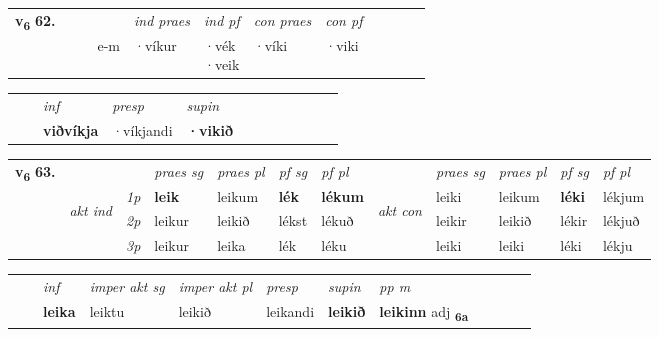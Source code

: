 \begin{tabular}{llllllllllll}\toprule
\multirow{4}{*}{{{\textbf{v{\textsubscript{6}}} \Large{\textbf{62.}}}}}  & &  & &  \textit{ind praes} & \textit{ind pf} & \textit{con praes} & \textit{con pf} \\*
&  & & e-m & ·víkur & \specialcell{·vék\\  ·veik} & ·víki & ·viki \\*
\cmidrule{5-9}
\end{tabular}


\begin{tabular}{llllllllllll}
 & & \textit{inf}     & \textit{presp} & \textit{supin}       \\*
  & & \textbf{viðvíkja}      & ·víkjandi &  \textbf{·vikið}   \\*
\cmidrule{1-12}
\end{tabular}



\begin{tabular}{llllllllllll} \toprule
\multirow{4}{*}{{{\textbf{v{\textsubscript{6}}} \Large{\textbf{63.}}}}}  & &   &  \textit{praes sg}  & \textit{praes pl}  &\textit{ pf sg} & \textit{pf pl} &  &  \textit{praes sg}  & \textit{praes pl}  & \textit{pf sg} & \textit{pf pl } \\*
	\cmidrule{4-7} \cmidrule{9-12}
 & \multirow{3}{*}{\begin{turn}{90}\textit{akt ind}\end{turn}} & {\textit{1p}} & \textbf{leik} & leikum    & \textbf{lék} & \textbf{lékum} & \multirow{3}{*}{\begin{turn}{90}\textit{akt con}\end{turn}} &leiki & leikum & \textbf{léki} & lékjum\\*
& &  {\textit{2p}} &  leikur  & leikið   & lékst & lékuð & & leikir & leikið & lékir & lékjuð \\*
& &  {\textit{3p}} & leikur & leika   & lék & léku & & leiki & leiki& léki & lékju  \\*
\cmidrule{4-7} \cmidrule{9-12}
\end{tabular}


\begin{tabular}{llllllllllll}
 & & \textit{inf} & \textit{imper akt sg} & \textit{imper akt pl}   & \textit{presp} & \textit{supin}  & \textit{pp m}     \\*
  & & \textbf{leika} & leiktu  & leikið   & leikandi &  \textbf{leikið}  & \textbf{leikinn} adj \textbf{\textsubscript{6a}} \\*
\cmidrule{1-12}
\end{tabular}




